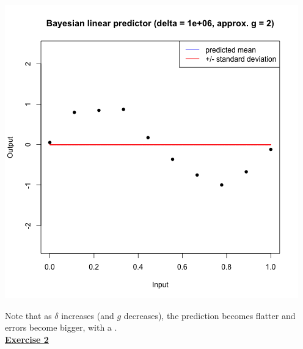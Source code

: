 \documentclass[a4paper, 11pt]{article}
\begin{document}
\begin{center}
\includegraphics[scale=0.6]{ps3F_plot13.png}
\end{center}
Note that as $\delta$ increases (and $g$ decreases), the prediction becomes flatter and errors become bigger, with a .\\
\newline \textbf{\underline{Exercise 2}}\\
\end{document}

